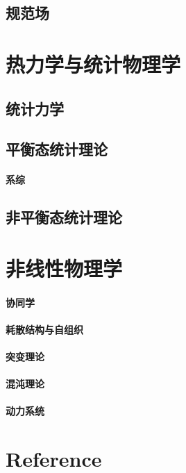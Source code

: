 \documentclass[UTF8]{../06-Physics}
\begin{document}
    \section{规范场}


\chapter{热力学与统计物理学} %
\section{统计力学}
\section{平衡态统计理论}
    \subsubsection{系综}
\section{非平衡态统计理论}






\chapter{非线性物理学}
    \subsubsection{协同学}
    \subsubsection{耗散结构与自组织}
    \subsubsection{突变理论}
    \subsubsection{混沌理论}
    \subsubsection{动力系统}


\chapter{Reference}
\end{document}
